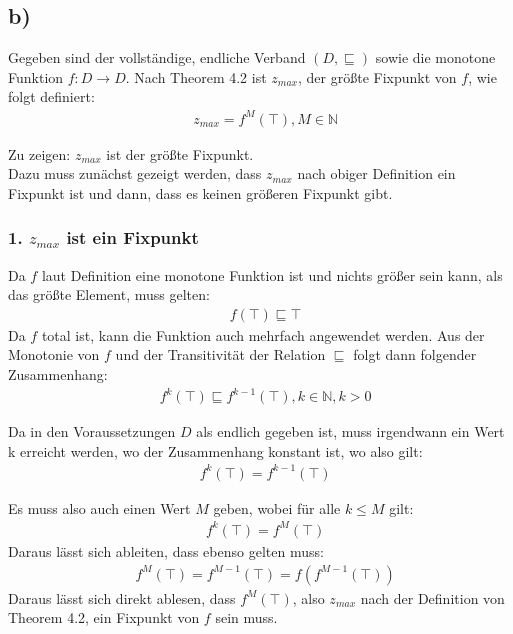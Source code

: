 \subsection*{b)}

Gegeben sind der vollständige, endliche Verband $(D, \sqsubseteq)$ sowie
die monotone Funktion $f: D \to D$.
Nach  Theorem 4.2 ist $z_{max}$, der größte Fixpunkt von $f$, wie folgt definiert:
\begin{align*}
&z_{max} = f^M(\top), M \in \mathbb{N}
\end{align*}

Zu zeigen: $z_{max}$ ist der größte Fixpunkt. \\
Dazu muss zunächst gezeigt werden, dass $z_{max}$ nach obiger Definition ein Fixpunkt ist
 und dann, dass es keinen größeren Fixpunkt gibt.

\subsubsection*{1. $z_{max}$ ist ein Fixpunkt}
Da $f$ laut Definition eine monotone Funktion ist und nichts größer sein kann,
als das größte Element, muss gelten:
\begin{align*}
& f(\top) \sqsubseteq \top
\end{align*}
Da $f$ total ist, kann die Funktion auch mehrfach angewendet werden.
Aus der Monotonie von $f$ und der Transitivität der Relation $\sqsubseteq$ folgt dann folgender Zusammenhang:
\begin{align*}
& f^k(\top) \sqsubseteq f^{k-1}(\top), k \in \mathbb{N}, k > 0
\end{align*}

Da in den Voraussetzungen $D$ als endlich gegeben ist, muss irgendwann ein Wert k erreicht werden,
wo der Zusammenhang konstant ist, wo also gilt:
\begin{align*}
& f^k(\top) = f^{k-1}(\top)
\end{align*}

Es muss also auch einen Wert $M$ geben, wobei für alle $k \leq M$ gilt:
\begin{align*}
& f^k(\top) = f^M(\top)
\end{align*}
Daraus lässt sich ableiten, dass ebenso gelten muss:
\begin{align*}
& f^M(\top) = f^{M-1}(\top) = f(f^{M-1}(\top))
\end{align*}
Daraus lässt sich direkt ablesen, dass $f^M(\top)$,
 also $z_{max}$ nach der Definition von Theorem 4.2,
 ein Fixpunkt von $f$ sein muss.

